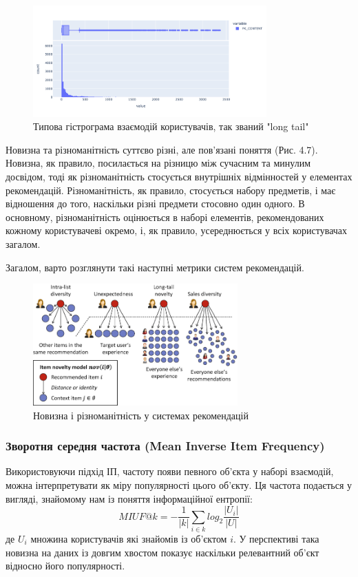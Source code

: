 \begin{figure}
    \centering
    \includegraphics[width=0.8\textwidth]{images/long_tail.png}
    \caption{Типова гістрограма взаємодій користувачів, так званий "long tail" }
\end{figure}

Новизна та різноманітність суттєво різні, але пов'язані поняття (Рис. 4.7). Новизна, як правило, посилається на різницю між сучасним та минулим досвідом, тоді як різноманітність стосується внутрішніх відмінностей у елементах рекомендацій. Різноманітність, як правило, стосується набору предметів, і має відношення до того, наскільки різні предмети стосовно один одного. В основному, різноманітність оцінюється в наборі елементів, рекомендованих кожному користувачеві окремо, і, як правило, усереднюється у всіх користувачах загалом.

Загалом, варто розглянути такі наступні метрики систем рекомендацій.
\begin{figure}
    \centering
    \includegraphics[width=0.7\textwidth]{images/novelity_diversity.png}
    \caption{Новизна і різноманітність у системах рекомендацій}
\end{figure}
\subsubsection{Зворотня середня частота (Mean Inverse Item Frequency)}
Використовуючи підхід ІП, частоту появи певного об’єкта у наборі взаємодій, можна інтерпретувати як міру популярності цього об’єкту. Ця частота подається у вигляді, знайомому нам із поняття інформаційної ентропії:
\[MIUF@k = -\frac{1}{|k|}\sum_{i \in k}log_{2}\frac{|U_i|}{|U|}\]
де $U_i$ множина користувачів які знайомів із об’єктом $i$. 
У перспективі така новизна на даних із довгим хвостом показує наскільки релевантний об’єкт відносно його популярності.

